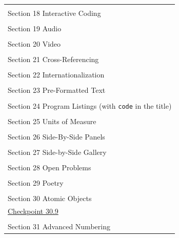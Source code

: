 \documentclass{amsart}
\theoremstyle{plain}%
\theoremstyle{definition}%
\theoremstyle{remark}%
\newcommand{\mono}[1]{\texttt{#1}}
\numberwithin{equation}{section}
\begin{document}
\begin{appendices}
\begin{longtable}[l]{ll}
\multicolumn{2}{l}{\null}\\[1.5ex] \multicolumn{2}{l}{\large Section 18 Interactive Coding}\\[0.5ex]
\multicolumn{2}{l}{\null}\\[1.5ex] \multicolumn{2}{l}{\large Section 19 Audio}\\[0.5ex]
\multicolumn{2}{l}{\null}\\[1.5ex] \multicolumn{2}{l}{\large Section 20 Video}\\[0.5ex]
\multicolumn{2}{l}{\null}\\[1.5ex] \multicolumn{2}{l}{\large Section 21 Cross-Referencing}\\[0.5ex]
\multicolumn{2}{l}{\null}\\[1.5ex] \multicolumn{2}{l}{\large Section 22 Internationalization}\\[0.5ex]
\multicolumn{2}{l}{\null}\\[1.5ex] \multicolumn{2}{l}{\large Section 23 Pre-Formatted Text}\\[0.5ex]
\multicolumn{2}{l}{\null}\\[1.5ex] \multicolumn{2}{l}{\large Section 24 Program Listings (with \mono{code} in the title)}\\[0.5ex]
\multicolumn{2}{l}{\null}\\[1.5ex] \multicolumn{2}{l}{\large Section 25 Units of Measure}\\[0.5ex]
\multicolumn{2}{l}{\null}\\[1.5ex] \multicolumn{2}{l}{\large Section 26 Side-By-Side Panels}\\[0.5ex]
\multicolumn{2}{l}{\null}\\[1.5ex] \multicolumn{2}{l}{\large Section 27 Side-by-Side Gallery}\\[0.5ex]
\multicolumn{2}{l}{\null}\\[1.5ex] \multicolumn{2}{l}{\large Section 28 Open Problems}\\[0.5ex]
\multicolumn{2}{l}{\null}\\[1.5ex] \multicolumn{2}{l}{\large Section 29 Poetry}\\[0.5ex]
\multicolumn{2}{l}{\null}\\[1.5ex] \multicolumn{2}{l}{\large Section 30 Atomic Objects}\\[0.5ex]
\hyperref[atomic-image-25]{Checkpoint 30.9}& \\
\multicolumn{2}{l}{\null}\\[1.5ex] \multicolumn{2}{l}{\large Section 31 Advanced Numbering}\\[0.5ex]

\end{longtable}
\end{appendices}
\end{document}

